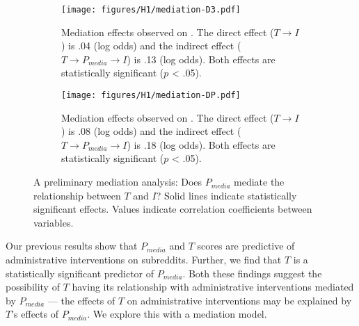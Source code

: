 
\begin{figure}[t]

\begin{subfigure}[b]{\linewidth}
         \centering
         \texttt{[image: figures/H1/mediation-D3.pdf]}
         \caption{Mediation effects observed on . The direct effect ($T
         \rightarrow I$) is .04 (log odds) and the indirect effect ($T
         \rightarrow P_{media} \rightarrow I$) is .13 (log odds). Both
         effects are statistically significant ($p$ < .05).}
         \label{figure:relationship:simplemediation:D3k}
     \end{subfigure}

     \begin{subfigure}[b]{\linewidth}
         \centering
           \texttt{[image: figures/H1/mediation-DP.pdf]}
         \caption{Mediation effects observed on .  The direct effect ($T
         \rightarrow I$) is .08 (log odds) and the indirect effect ($T
         \rightarrow P_{media} \rightarrow I$) is .18 (log odds). Both
         effects are statistically significant ($p$ < .05).}
         \label{figure:relationship:simplemediation:Dp}
         \label{fig:H1-mediation-DP}
     \end{subfigure}
     \caption{A preliminary mediation analysis: Does $P_{media}$ mediate the
     relationship between $T$ and $I$? Solid lines indicate statistically
     significant effects. Values indicate correlation coefficients between
     variables. }
     \label{figure:relationship:simplemediation}
\end{figure}

 Our previous results show
that $P_{media}$ and $T$ scores are predictive of administrative interventions
on subreddits.  Further, we find that $T$ is a statistically significant
predictor of $P_{media}$. Both these findings suggest the possibility of $T$
having its relationship with administrative interventions mediated by
$P_{media}$ --- \ie the effects of $T$ on administrative interventions may be
explained by $T$'s effects of $P_{media}$. We explore this with a  mediation
model.

